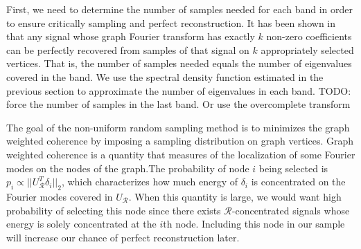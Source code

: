 \documentclass[a4paper]{article}
\newcommand{\R}{\mathcal{R}}
\theoremstyle{definition}
\begin{document}
First, we need to determine the number of samples needed for each band in order to ensure critically sampling and perfect reconstruction. It has been shown in \cite{} \cite{} that any signal whose graph Fourier transform has exactly $k$ non-zero coefficients can be perfectly recovered from samples of that signal on $k$ appropriately selected vertices. That is, the number of samples needed equals the number of eigenvalues covered in the band. We use the spectral density function estimated in the previous section to approximate the number of eigenvalues in each band. TODO: force the number of samples in the last band. Or use the overcomplete transform 

The goal of the non-uniform random sampling method is to minimizes the graph weighted coherence by imposing a sampling distribution on graph vertices. Graph weighted coherence is a quantity that measures of the localization of some Fourier modes on the nodes of the graph.The probability of node $i$ being selected is $p_i\propto ||U_{\R}^T\delta_i||_2$, which characterizes how much energy of $\delta_i$ is concentrated on the Fourier modes covered in $U_{\R}$. When this quantity is large, we would want high probability of selecting this node since there exists $\R$-concentrated signals whose energy is solely concentrated at the $i$th node. Including this node in our sample will increase our chance of perfect reconstruction later.
\end{document}
